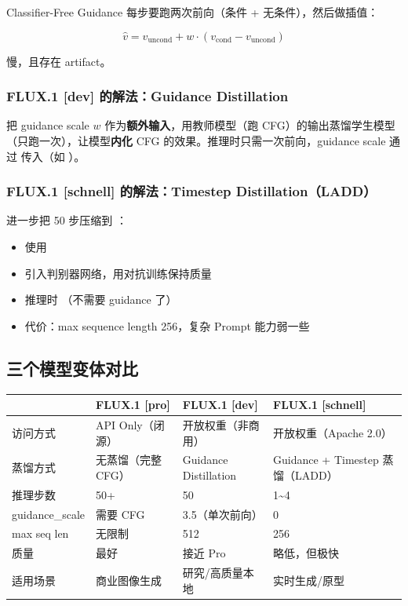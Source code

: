 Classifier-Free Guidance 每步要跑两次前向（条件 + 无条件），然后做插值：

$$\hat{v} = v_\text{uncond} + w \cdot (v_\text{cond} - v_\text{uncond})$$

慢，且存在 artifact。

\subsubsection{FLUX.1 [dev] 的解法：Guidance Distillation}

把 guidance scale $w$ 作为\textbf{额外输入}，用教师模型（跑 CFG）的输出蒸馏学生模型（只跑一次），让模型\textbf{内化} CFG 的效果。推理时只需一次前向，guidance scale 通过  传入（如 ）。

\subsubsection{FLUX.1 [schnell] 的解法：Timestep Distillation（LADD）}

进一步把 50 步压缩到 ：

\begin{itemize}[leftmargin=1.5em]
  \item 使用 
  \item 引入判别器网络，用对抗训练保持质量
  \item 推理时 （不需要 guidance 了）
  \item 代价：max sequence length 256，复杂 Prompt 能力弱一些
\end{itemize}

\subsection{三个模型变体对比}

\begin{summarybox}
\begin{center}
{\small
\begin{tabular}{p{2.8cm}p{3.5cm}p{3.5cm}p{3.8cm}}
\hline
 & \textbf{FLUX.1 [pro]} & \textbf{FLUX.1 [dev]} & \textbf{FLUX.1 [schnell]} \\
\hline
访问方式 & API Only（闭源） & 开放权重（非商用） & 开放权重（Apache 2.0）\\
蒸馏方式 & 无蒸馏（完整 CFG） & Guidance Distillation & Guidance + Timestep 蒸馏（LADD）\\
推理步数 & 50+ & 50 & 1\textasciitilde4 \\
guidance\_scale & 需要 CFG & 3.5（单次前向） & 0 \\
max seq len & 无限制 & 512 & 256 \\
质量 & 最好 & 接近 Pro & 略低，但极快 \\
适用场景 & 商业图像生成 & 研究/高质量本地 & 实时生成/原型 \\
\hline
\end{tabular}
}
\end{center}
\end{summarybox}

